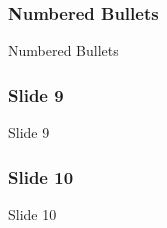 \documentclass{beamer}
\begin{document}

\begin{frame}
\frametitle{Numbered Bullets}

Numbered Bullets
\end{frame}


\begin{frame}
\frametitle{Slide 9}

Slide 9
\end{frame}


\begin{frame}
\frametitle{Slide 10}

Slide 10
\end{frame}


\end{document}
